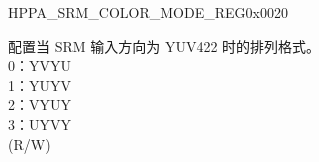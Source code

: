 \addtocounter{Regfloat}{-1}
\begin{register}{H}{PPA\_SRM\_COLOR\_MODE\_REG}{0x0020}
\begin{regdesc}\begin{reglist}
\item [接上页...]
\label{fielddesc:PPAYUV422RXBYTEORDER}\item [PPA\_YUV422\_RX\_BYTE\_ORDER] 配置当 SRM 输入方向为 YUV422 时的排列格式。\\0：YVYU\\1：YUYV\\2：VYUY\\3：UYVY\\(R/W)
\end{reglist}\end{regdesc}
\end{register}


